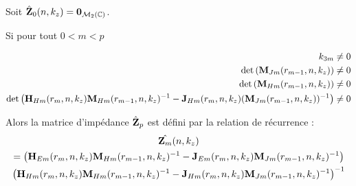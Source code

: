     \begin{thm}
      Soit \(\hat {\mathbf{Z}}_0(n,k_z) = \mathbf{0}_{\mathcal{M}_2(\mathbb C)}\).

      Si pour tout \(0 < m < p\)

      \begin{equation}
        \begin{aligned}
          k_{3m} & \not = 0 \\
          \det\left(\mathbf{M}_{Jm}(r_{m-1},n,k_z)\right) & \not = 0
          \\
          \det\left(\mathbf{M}_{Hm}(r_{m-1},n,k_z)\right) & \not = 0
          \\
          \det\left(\mathbf{H}_{Hm}(r_{m},n,k_z)\mathbf{M}_{Hm}(r_{m-1},n,k_z)^{-1} - \mathbf{J}_{Hm}(r_{m},n,k_z)(\mathbf{M}_{Jm}(r_{m-1},n,k_z))^{-1}\right) &\not = 0
        \end{aligned}
      \end{equation}

      Alors la matrice d'impédance \(\hat{\mathbf{Z}}_p\) est défini par la relation de récurrence :
      \begin{multline}
        \hat{\mathbf{Z}_m}(n,k_z) \\
          = \left(\mathbf{H}_{Em}(r_m,n,k_z)\mathbf{M}_{Hm}(r_{m-1},n,k_z)^{-1} - \mathbf{J}_{Em}(r_m,n,k_z)\mathbf{M}_{Jm}(r_{m-1},n,k_z)^{-1}\right) 
          \\
          \left(\mathbf{H}_{Hm}(r_m,n,k_z)\mathbf{M}_{Hm}(r_{m-1},n,k_z)^{-1} - \mathbf{J}_{Hm}(r_m,n,k_z)\mathbf{M}_{Jm}(r_{m-1},n,k_z)^{-1}\right)^{-1}
      \end{multline}
    \end{thm}

